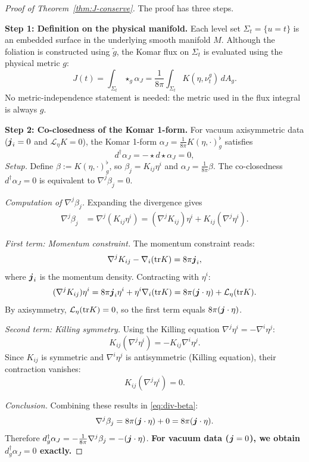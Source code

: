 \begin{proof}[Proof of Theorem~\ref{thm:J-conserve}]
The proof has three steps.

\textbf{Step 1: Definition on the physical manifold.}
Each level set $\Sigma_t=\{u=t\}$ is an embedded surface in the underlying smooth manifold $M$. Although the foliation is constructed using $\tilde g$, the Komar flux on $\Sigma_t$ is evaluated using the physical metric $g$:
\[
J(t)=\int_{\Sigma_t}\star_g\alpha_J
     =\frac{1}{8\pi}\int_{\Sigma_t}K(\eta,\nu_t^g)\,dA_g.
\]
No metric-independence statement is needed: the metric used in the flux integral is always $g$.

\textbf{Step 2: Co-closedness of the Komar 1-form.}
For vacuum axisymmetric data ($\boldsymbol{j}_i = 0$ and $\mathcal{L}_\eta K = 0$), the Komar 1-form $\alpha_J = \frac{1}{8\pi}K(\eta, \cdot)^\flat_g$ satisfies
\begin{equation}\label{eq:key-coclosed}
d^\dagger \alpha_J = -\star d\star \alpha_J = 0,
\end{equation}
\textit{Setup.} Define $\beta := K(\eta, \cdot)^\flat_g$, so $\beta_j = K_{ij}\eta^i$ and $\alpha_J = \frac{1}{8\pi}\beta$. The co-closedness $d^\dagger \alpha_J = 0$ is equivalent to $\nabla^j \beta_j = 0$.

\textit{Computation of $\nabla^j \beta_j$.} Expanding the divergence gives
\begin{align}
\nabla^j \beta_j &= \nabla^j (K_{ij}\eta^i) = (\nabla^j K_{ij})\eta^i + K_{ij}(\nabla^j \eta^i). \label{eq:div-beta}
\end{align}

\textit{First term: Momentum constraint.} The momentum constraint reads:
\[
\nabla^j K_{ij} - \nabla_i (\mathrm{tr} K) = 8\pi \boldsymbol{j}_i,
\]
where $\boldsymbol{j}_i$ is the momentum density. Contracting with $\eta^i$:
\[
(\nabla^j K_{ij})\eta^i = 8\pi \boldsymbol{j}_i \eta^i + \eta^i \nabla_i(\mathrm{tr} K) = 8\pi (\boldsymbol{j} \cdot \eta) + \mathcal{L}_\eta(\mathrm{tr} K).
\]
By axisymmetry, $\mathcal{L}_\eta(\mathrm{tr} K) = 0$, so the first term equals $8\pi(\boldsymbol{j} \cdot \eta)$.

\textit{Second term: Killing symmetry.} Using the Killing equation $\nabla^j \eta^i = -\nabla^i \eta^j$:
\[
K_{ij}(\nabla^j \eta^i) = -K_{ij}\nabla^i \eta^j.
\]
Since $K_{ij}$ is symmetric and $\nabla^i \eta^j$ is antisymmetric (Killing equation), their contraction vanishes:
\[
K_{ij}(\nabla^j \eta^i) = 0.
\]

\textit{Conclusion.} Combining these results in \eqref{eq:div-beta}:
\[
\nabla^j \beta_j = 8\pi(\boldsymbol{j} \cdot \eta) + 0 = 8\pi(\boldsymbol{j} \cdot \eta).
\]
Therefore $d^\dagger_g \alpha_J = -\frac{1}{8\pi}\nabla^j \beta_j = -(\boldsymbol{j} \cdot \eta)$. \textbf{For vacuum data ($\boldsymbol{j} = 0$), we obtain $d^\dagger_g \alpha_J = 0$ exactly.}


\end{proof}
